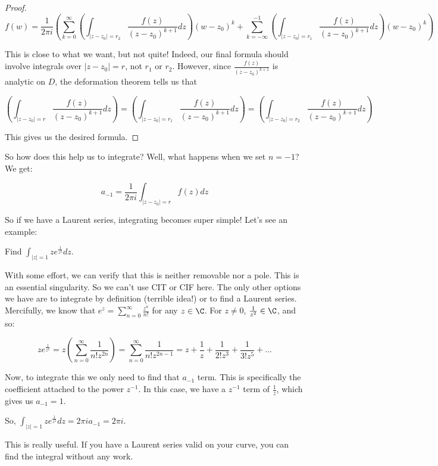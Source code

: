 \begin{proof}
$$f(w) = \frac{1}{2\pi i} \left(\sum_{k = 0}^\infty \left(\int_{|z-z_0| = r_2} \frac{f(z)}{(z-z_0)^{k+1}}dz\right)(w-z_0)^k + \sum_{k = -\infty}^{-1} \left(\int_{|z-z_0| = r_1} \frac{f(z)}{(z-z_0)^{k+1}}dz\right)(w-z_0)^k\right)$$

This is close to what we want, but not quite! Indeed, our final formula should involve integrals over $|z-z_0| = r$, not $r_1$ or $r_2$. However, since $\frac{f(z)}{(z-z_0)^{k+1}}$ is analytic on $D$, the deformation theorem tells us that

$$\left(\int_{|z-z_0| = r} \frac{f(z)}{(z-z_0)^{k+1}}dz\right)=\left(\int_{|z-z_0| = r_1} \frac{f(z)}{(z-z_0)^{k+1}}dz\right)=\left(\int_{|z-z_0| = r_2} \frac{f(z)}{(z-z_0)^{k+1}}dz\right)$$

This gives us the desired formula.
\end{proof}

So how does this help us to integrate? Well, what happens when we set $n = -1$? We get:

$$a_{-1} = \frac{1}{2\pi i} \int_{|z-z_0| = r}f(z)dz$$

So if we have a Laurent series, integrating becomes super simple! Let's see an example:

\begin{ex}{}{} Find $\int_{|z| = 1} ze^{\frac{1}{z^2}}dz$.

With some effort, we can verify that this is neither removable nor a pole. This is an essential singularity. So we can't use CIT or CIF here. The only other options we have are to integrate by definition (terrible idea!) or to find a Laurent series. Mercifully, we know that $e^{z} = \sum_{n = 0}^\infty \frac{z^n}{n!}$ for any $z\in \C$. For $z\ne 0$, $\frac{1}{z^2}\in \C$, and so:

$$ze^{\frac{1}{z^2}} = z\left(\sum_{n = 0}^\infty \frac{1}{n!z^{2n}}\right) = \sum_{n = 0}^\infty \frac{1}{n!z^{2n-1}} = z + \frac{1}{z} + \frac{1}{2!z^3} + \frac{1}{3!z^5} + ...$$

Now, to integrate this we only need to find that $a_{-1}$ term. This is specifically the coefficient attached to the power $z^{-1}$. In this case, we have a $z^{-1}$ term of $\frac{1}{z}$, which gives us $a_{-1} = 1$.

So, $\int_{|z| = 1} ze^{\frac{1}{z^2}}dz = 2\pi i a_{-1} = 2\pi i$.

\end{ex}

This is really useful. If you have a Laurent series valid on your curve, you can find the integral without any work. 

